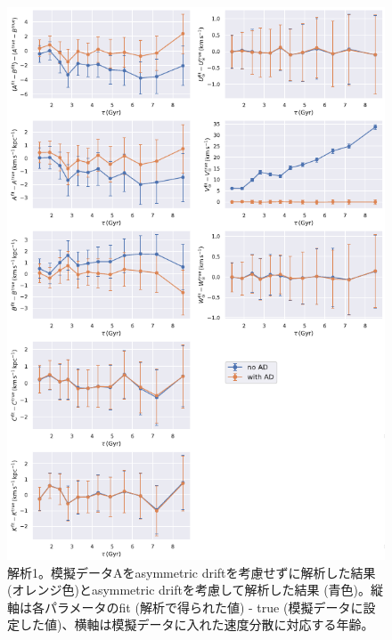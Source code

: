 \begin{figure}[htbp]
	\centering
	\includegraphics[width=15cm]{fig/Mock_AD.pdf}
	\caption{解析1。模擬データAをasymmetric driftを考慮せずに解析した結果 (オレンジ色)とasymmetric driftを考慮して解析した結果 (青色)。縦軸は各パラメータのfit (解析で得られた値) - true (模擬データに設定した値)、横軸は模擬データに入れた速度分散に対応する年齢。} \label{fig:Mock_AD}
\end{figure}


